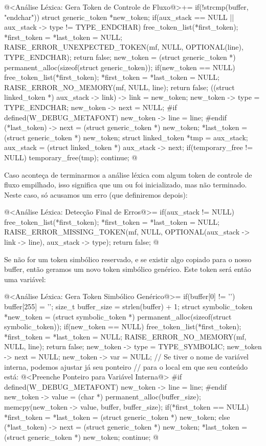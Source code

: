 \iniciocodigo
@<Análise Léxica: Gera Token de Controle de Fluxo@>+=
if(!strcmp(buffer, "endchar")){
  struct generic_token *new_token;
  if(aux_stack == NULL || aux_stack -> type != TYPE_ENDCHAR){
    free_token_list(*first_token);
    *first_token = *last_token = NULL;
    RAISE_ERROR_UNEXPECTED_TOKEN(mf, NULL, OPTIONAL(line), TYPE_ENDCHAR);
    return false;
  }
  new_token = (struct generic_token *)
                permanent_alloc(sizeof(struct generic_token));
  if(new_token == NULL){
    free_token_list(*first_token);
    *first_token = *last_token = NULL;
    RAISE_ERROR_NO_MEMORY(mf, NULL, line);
    return false;
  }
  ((struct linked_token *) aux_stack -> link) -> link = new_token;
  new_token -> type = TYPE_ENDCHAR;
  new_token -> next = NULL;
#if defined(W_DEBUG_METAFONT)
  new_token -> line = line;
#endif
  (*last_token) -> next = (struct generic_token *) new_token;
  *last_token = (struct generic_token *) new_token;
  struct linked_token *tmp = aux_stack;
  aux_stack = (struct linked_token *) aux_stack -> next;
  if(temporary_free != NULL)
    temporary_free(tmp);
  continue;
}
@
\fimcodigo


Caso aconteça de terminarmos a análise léxica com algum token de
controle de fluxo empilhado, isso significa que um 
ou  foi inicializado, mas não terminado. Neste caso, só
acusamos um erro (que definiremos depois):

\iniciocodigo
@<Análise Léxica: Detecção Final de Erros@>=
if(aux_stack != NULL){
  free_token_list(*first_token);
  *first_token = *last_token = NULL;
  RAISE_ERROR_MISSING_TOKEN(mf, NULL, OPTIONAL(aux_stack -> link -> line),
                           aux_stack -> type);
  return false;
}
@
\fimcodigo


Se não for um token simbólico reservado, e se existir algo copiado
para o nosso buffer, então geramos um novo token simbólico
genérico. Este token será então uma variável:

\iniciocodigo
@<Análise Léxica: Gera Token Simbólico Genérico@>=
if(buffer[0] != '\0'){
  buffer[255] = '\0';
  size_t buffer_size = strlen(buffer) + 1;
  struct symbolic_token *new_token =
     (struct symbolic_token *) permanent_alloc(sizeof(struct symbolic_token));
  if(new_token == NULL){
    free_token_list(*first_token);
    *first_token = *last_token = NULL;
    RAISE_ERROR_NO_MEMORY(mf, NULL, line);
    return false;
  }
  new_token -> type = TYPE_SYMBOLIC;
  new_token -> next = NULL;
  new_token -> var = NULL;
  // Se tiver o nome de variável interna, podemos ajustar já seu ponteiro
  // para  o local em que seu conteúdo está:
  @<Preenche Ponteiro para Variável Interna@>
#if defined(W_DEBUG_METAFONT)
  new_token -> line = line;
#endif
  new_token -> value = (char *) permanent_alloc(buffer_size);
  memcpy(new_token -> value, buffer, buffer_size);
  if(*first_token == NULL)
    *first_token = *last_token = (struct generic_token *) new_token;
  else{
    (*last_token) -> next = (struct generic_token *) new_token;
    *last_token = (struct generic_token *) new_token;
  }
  continue;
}
@
\fimcodigo

